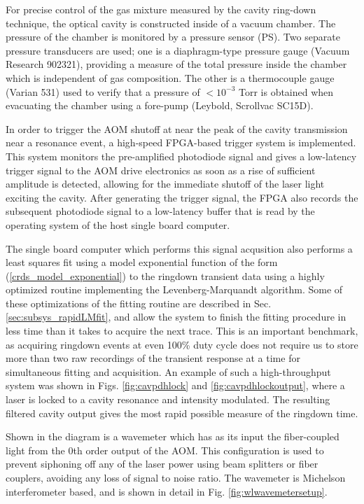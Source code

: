 \documentclass[8pt,a4paper]{report}
\begin{document}
	For precise control of the gas mixture measured by the cavity ring-down technique, the optical cavity is constructed inside of a vacuum chamber. The pressure of the chamber is monitored by a pressure sensor (PS). Two separate pressure transducers are used; one is a diaphragm-type pressure gauge (Vacuum Research 902321), providing a measure of the total pressure inside the chamber which is independent of gas composition. The other is a thermocouple gauge (Varian 531) used to verify that a pressure of $<10^{-3}$ Torr is obtained when evacuating the chamber using a fore-pump (Leybold, Scrollvac SC15D).
	
	In order to trigger the AOM shutoff at near the peak of the cavity transmission near a resonance event, a high-speed FPGA-based trigger system is implemented. This system monitors the pre-amplified photodiode signal and gives a low-latency trigger signal to the AOM drive electronics as soon as a rise of sufficient amplitude is detected, allowing for the immediate shutoff of the laser light exciting the cavity. After generating the trigger signal, the FPGA also records the subsequent photodiode signal to a low-latency buffer that is read by the operating system of the host single board computer.
	
	The single board computer which performs this signal acqusition also performs a least squares fit using a model exponential function of the form (\ref{crds_model_exponential}) to the ringdown transient data using a highly optimized routine implementing the Levenberg-Marquandt algorithm. Some of these optimizations of the fitting routine are described in Sec. \ref{sec:subsys_rapidLMfit}, and allow the system to finish the fitting procedure in less time than it takes to acquire the next trace. This is an important benchmark, as acquiring ringdown events at even 100\% duty cycle does not require us to store more than two raw recordings of the transient response at a time for simultaneous fitting and acquisition. An example of such a high-throughput system was shown in Figs. \ref{fig:cavpdhlock} and \ref{fig:cavpdhlockoutput}, where a laser is locked to a cavity resonance and intensity modulated. The resulting filtered cavity output gives the most rapid possible measure of the ringdown time.
	
	Shown in the diagram is a wavemeter which has as its input the fiber-coupled light from the 0th order output of the AOM. This configuration is used to prevent siphoning off any of the laser power using beam splitters or fiber couplers, avoiding any loss of signal to noise ratio. The wavemeter is Michelson interferometer based, and is shown in detail in Fig. \ref{fig:wlwavemetersetup}.
	
\end{document}
